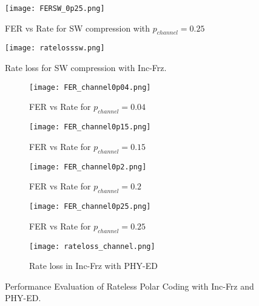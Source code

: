 \documentclass[
11pt, %
a4paper, %
oneside, %
headinclude,footinclude, %
BCOR5mm, %
]{scrartcl}
\begin{document}
\begin{figure}[h]
 \begin{center}
    \texttt{[image: FERSW\_0p25.png]}
  \end{center}
  \caption{FER vs Rate for SW compression with $p_{channel}=0.25$ }
  \label{fig:fersw4}
\end{figure}
\begin{figure}[h]
 \begin{center}
    \texttt{[image: ratelosssw.png]}
  \end{center}
  \caption{Rate loss for SW compression with Inc-Frz.}
  \label{fig:rlsw}
\end{figure}
\clearpage
\begin{figure}[h]
\centering
\begin{subfigure}{.5\textwidth}
  \centering
  \texttt{[image: FER\_channel0p04.png]}
  \caption{FER vs Rate for $p_{channel}=0.04$}
  \label{fig:pch1}
\end{subfigure}%
\begin{subfigure}{.5\textwidth}
  \centering
  \texttt{[image: FER\_channel0p15.png]}
  \caption{FER vs Rate for $p_{channel}=0.15$}
  \label{fig:pch2}
\end{subfigure}
\begin{subfigure}{.5\textwidth}
  \centering
  \texttt{[image: FER\_channel0p2.png]}
  \caption{FER vs Rate for $p_{channel}=0.2$}
  \label{fig:pch3}
\end{subfigure}%
\begin{subfigure}{.5\textwidth}
  \centering
  \texttt{[image: FER\_channel0p25.png]}
  \caption{FER vs Rate for $p_{channel}=0.25$}
  \label{fig:pch4}
\end{subfigure}
\begin{subfigure}{.5\textwidth}
  \centering
  \texttt{[image: rateloss\_channel.png]}
  \caption{Rate loss in Inc-Frz with PHY-ED}
  \label{fig:rlch}
\end{subfigure}
\caption{Performance Evaluation of Rateless Polar Coding with Inc-Frz and PHY-ED.}
\label{fig:perfch}
\end{figure}
\clearpage
\end{document}

